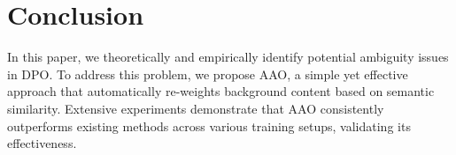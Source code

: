 \section{Conclusion}
In this paper, we theoretically and empirically identify potential ambiguity issues in DPO. To address this problem, we propose AAO, a simple yet effective approach that automatically re-weights background content based on semantic similarity. Extensive experiments demonstrate that AAO consistently outperforms existing methods across various training setups, validating its effectiveness. 
